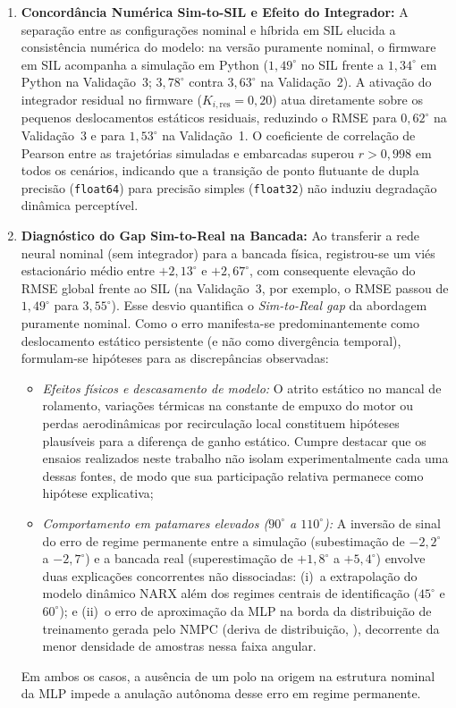 \begin{enumerate}
    \item \textbf{Concordância Numérica Sim-to-SIL e Efeito do Integrador:} A separação entre as configurações nominal e híbrida em SIL elucida a consistência numérica do modelo: na versão puramente nominal, o firmware em SIL acompanha a simulação em Python ($1,49^\circ$ no SIL frente a $1{,}34^\circ$ em Python na Validação~3; $3,78^\circ$ contra $3{,}63^\circ$ na Validação~2). A ativação do integrador residual no firmware ($K_{i,\text{res}} = 0{,}20$) atua diretamente sobre os pequenos deslocamentos estáticos residuais, reduzindo o RMSE para $0{,}62^\circ$ na Validação~3 e para $1{,}53^\circ$ na Validação~1. O coeficiente de correlação de Pearson entre as trajetórias simuladas e embarcadas superou $r > 0{,}998$ em todos os cenários, indicando que a transição de ponto flutuante de dupla precisão (\texttt{float64}) para precisão simples (\texttt{float32}) não induziu degradação dinâmica perceptível.
    
    \item \textbf{Diagnóstico do Gap Sim-to-Real na Bancada:} Ao transferir a rede neural nominal (sem integrador) para a bancada física, registrou-se um viés estacionário médio entre $+2{,}13^\circ$ e $+2{,}67^\circ$, com consequente elevação do RMSE global frente ao SIL (na Validação~3, por exemplo, o RMSE passou de $1{,}49^\circ$ para $3{,}55^\circ$). Esse desvio quantifica o \textit{Sim-to-Real gap} da abordagem puramente nominal. Como o erro manifesta-se predominantemente como deslocamento estático persistente (e não como divergência temporal), formulam-se hipóteses para as discrepâncias observadas:
    \begin{itemize}
        \item \textit{Efeitos físicos e descasamento de modelo:} O atrito estático no mancal de rolamento, variações térmicas na constante de empuxo do motor ou perdas aerodinâmicas por recirculação local constituem hipóteses plausíveis para a diferença de ganho estático. Cumpre destacar que os ensaios realizados neste trabalho não isolam experimentalmente cada uma dessas fontes, de modo que sua participação relativa permanece como hipótese explicativa;
        \item \textit{Comportamento em patamares elevados ($90^\circ$ a $110^\circ$):} A inversão de sinal do erro de regime permanente entre a simulação (subestimação de $-2{,}2^\circ$ a $-2{,}7^\circ$) e a bancada real (superestimação de $+1{,}8^\circ$ a $+5{,}4^\circ$) envolve duas explicações concorrentes não dissociadas: (i)~a extrapolação do modelo dinâmico NARX além dos regimes centrais de identificação ($45^\circ$ e $60^\circ$); e (ii)~o erro de aproximação da MLP na borda da distribuição de treinamento gerada pelo NMPC (deriva de distribuição, ), decorrente da menor densidade de amostras nessa faixa angular.
    \end{itemize}
    Em ambos os casos, a ausência de um polo na origem na estrutura nominal da MLP impede a anulação autônoma desse erro em regime permanente.
    

\end{enumerate}
